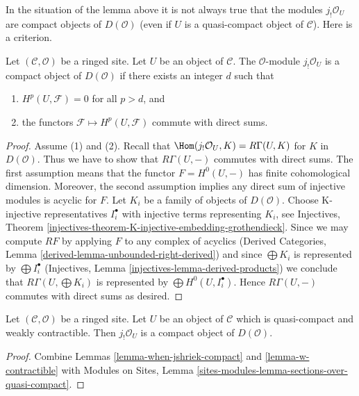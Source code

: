 \noindent
In the situation of the lemma above it is not always true that the
modules $j_!\mathcal{O}_U$ are compact objects of $D(\mathcal{O})$
(even if $U$ is a quasi-compact object of $\mathcal{C}$).
Here is a criterion.

\begin{lemma}
\label{lemma-when-jshriek-compact}
Let $(\mathcal{C}, \mathcal{O})$ be a ringed site. Let $U$ be an object of
$\mathcal{C}$. The $\mathcal{O}$-module $j_!\mathcal{O}_U$ is a
compact object of $D(\mathcal{O})$ if there exists an integer $d$ such that
\begin{enumerate}
\item $H^p(U, \mathcal{F}) = 0$ for all $p > d$, and
\item the functors $\mathcal{F} \mapsto H^p(U, \mathcal{F})$
commute with direct sums.
\end{enumerate}
\end{lemma}

\begin{proof}
Assume (1) and (2). Recall that $\Hom(j_!\mathcal{O}_U, K) = R\Gamma(U, K)$ for
$K$ in $D(\mathcal{O})$. Thus we have to show that $R\Gamma(U, -)$
commutes with direct sums. The first assumption means that the functor
$F = H^0(U, -)$ has finite cohomological dimension. Moreover, the second
assumption implies any direct sum of injective modules is acyclic for $F$.
Let $K_i$ be a family of objects of $D(\mathcal{O})$.
Choose K-injective representatives $I_i^\bullet$ with injective terms
representing $K_i$, see Injectives, Theorem
\ref{injectives-theorem-K-injective-embedding-grothendieck}.
Since we may compute $RF$ by applying $F$ to any complex of acyclics
(Derived Categories, Lemma \ref{derived-lemma-unbounded-right-derived})
and since $\bigoplus K_i$ is represented by $\bigoplus I_i^\bullet$
(Injectives, Lemma \ref{injectives-lemma-derived-products})
we conclude that $R\Gamma(U, \bigoplus K_i)$ is represented by
$\bigoplus H^0(U, I_i^\bullet)$. Hence $R\Gamma(U, -)$ commutes
with direct sums as desired.
\end{proof}

\begin{lemma}
\label{lemma-quasi-compact-weakly-contractible-compact}
Let $(\mathcal{C}, \mathcal{O})$ be a ringed site. Let $U$
be an object of $\mathcal{C}$ which is quasi-compact and
weakly contractible. Then
$j_!\mathcal{O}_U$ is a compact object of $D(\mathcal{O})$.
\end{lemma}

\begin{proof}
Combine Lemmas \ref{lemma-when-jshriek-compact} and
\ref{lemma-w-contractible} with
Modules on Sites, Lemma \ref{sites-modules-lemma-sections-over-quasi-compact}.
\end{proof}

